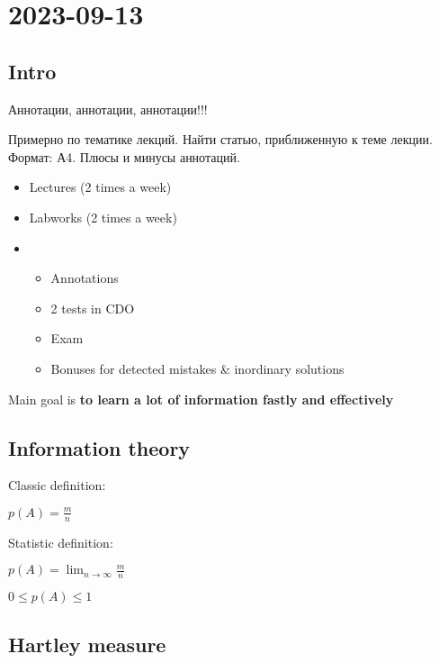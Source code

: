 \section{2023-09-13}

\subsection{Intro}
Аннотации, аннотации, аннотации!!!

Примерно по тематике лекций. Найти статью, приближенную к теме лекции. Формат: А4. Плюсы и минусы аннотаций.

\begin{itemize}
	\item Lectures (2 times a week)
	\item Labworks (2 times a week)
	\item 
		\begin{itemize}
			\item Annotations
			\item 2 tests in CDO
			\item Exam
			\item Bonuses for detected mistakes \& inordinary solutions 
		\end{itemize}
\end{itemize} 

\begin{note}[]
	Main goal is \textbf{to learn a lot of information fastly and effectively}
\end{note}

\subsection{Information theory}

Classic definition:
\begin{definition}[Probability]
	$p(A) = \frac{m}{n}$
\end{definition}

Statistic definition:
\begin{definition}[]
	$p(A) = \lim_{n \to \infty} \frac{m}{n}$
\end{definition}

\begin{property}[]
	$0 \leq p(A) \leq 1$
\end{property}

\subsection{Hartley measure}

